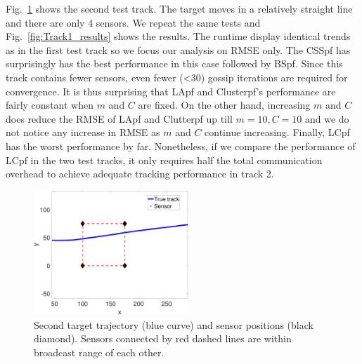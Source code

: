 \documentclass[10pt,letterpaper,final]{article}
\begin{document}
Fig.~\ref{fig:track1} shows the second test track. The target moves in a relatively straight line and there are only 4 sensors. We repeat the same tests and Fig.~\ref{fig:Track1_results} shows the results. The runtime display identical trends as in the first test track so we focus our analysis on RMSE only. The CSSpf has surprisingly has the best performance in this case followed by BSpf. Since this track contains fewer sensors, even fewer (<30) gossip iterations are required for convergence. It is thus surprising that LApf and Clusterpf's performance are fairly constant when $m$ and $C$ are fixed. On the other hand, increasing $m$ and $C$ does reduce the RMSE of LApf and Clutterpf up till $m=10, C=10$ and we do not notice any increase in RMSE as $m$ and $C$ continue increasing. Finally, LCpf has the worst performance by far. Nonetheless, if we compare the performance of LCpf in the two test tracks, it only requires half the total communication overhead to achieve adequate tracking performance in track 2. 

\begin{figure}
\centering
\includegraphics[width=0.52\textwidth]{Figures/track1}
\caption{Second target trajectory (blue curve) and sensor positions (black diamond). Sensors connected by red dashed lines are within broadcast range of each other.}
\label{fig:track1}
\end{figure}
\end{document}
